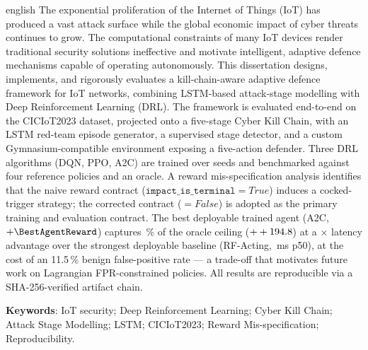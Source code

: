\begin{resumo}
\begin{otherlanguage*}{english}
The exponential proliferation of the Internet of Things (IoT) has produced a
vast attack surface while the global economic impact of cyber threats continues
to grow. The computational constraints of many IoT devices render traditional
security solutions ineffective and motivate intelligent, adaptive defence
mechanisms capable of operating autonomously. This dissertation designs,
implements, and rigorously evaluates a kill-chain-aware adaptive defence
framework for IoT networks, combining LSTM-based attack-stage modelling with
Deep Reinforcement Learning (DRL). The framework is evaluated end-to-end on the
CICIoT2023 dataset, projected onto a five-stage Cyber Kill Chain, with an LSTM
red-team episode generator, a supervised stage detector, and a custom
Gymnasium-compatible environment exposing a five-action defender. Three DRL
algorithms (DQN, PPO, A2C) are trained over \NumSeeds{} seeds and benchmarked
against four reference policies and an oracle. A reward mis-specification
analysis identifies that the naive reward contract ($\texttt{impact\_is\_terminal}
=\mathit{True}$) induces a cocked-trigger strategy; the corrected contract
($=\mathit{False}$) is adopted as the primary training and evaluation contract.
The best deployable trained agent (A2C, $+\BestAgentReward$) captures
\OracleCapturePct\,\% of the oracle ceiling ($++194.8$) at a
\LatencyRatio$\times$ latency advantage over the strongest deployable baseline
(RF-Acting, \RFLatency\,ms p50), at the cost of an 11.5\,\% benign false-positive
rate --- a trade-off that motivates future work on Lagrangian FPR-constrained
policies. All results are reproducible via a SHA-256-verified artifact chain.

    \vspace{\onelineskip}

    \noindent\textbf{Keywords}: IoT security; Deep Reinforcement Learning; Cyber
    Kill Chain; Attack Stage Modelling; LSTM; CICIoT2023; Reward Mis-specification;
    Reproducibility.

    \end{otherlanguage*}
\end{resumo}

\listoffigures*
\cleardoublepage

\listoftables*
\cleardoublepage

\tableofcontents*
\clearpage

\setcounter{page}{1}

